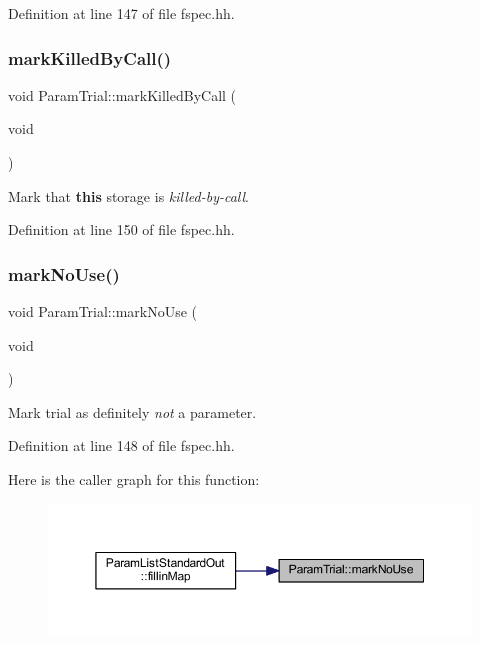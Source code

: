 Definition at line 147 of file fspec.\+hh.

\mbox{\label{class_param_trial_a8b08e858cac5d750f527a673be97e322}} 
\subsubsection{\texorpdfstring{markKilledByCall()}{markKilledByCall()}}
{\footnotesize\ttfamily void Param\+Trial\+::mark\+Killed\+By\+Call (\begin{DoxyParamCaption}\item[{void}]{ }\end{DoxyParamCaption})\hspace{0.3cm}{\ttfamily [inline]}}



Mark that {\bfseries{this}} storage is {\itshape killed-\/by-\/call}. 



Definition at line 150 of file fspec.\+hh.

\mbox{\label{class_param_trial_a7006ab058b4af10027cc87ee1b81b476}} 
\subsubsection{\texorpdfstring{markNoUse()}{markNoUse()}}
{\footnotesize\ttfamily void Param\+Trial\+::mark\+No\+Use (\begin{DoxyParamCaption}\item[{void}]{ }\end{DoxyParamCaption})\hspace{0.3cm}{\ttfamily [inline]}}



Mark trial as definitely {\itshape not} a parameter. 



Definition at line 148 of file fspec.\+hh.

Here is the caller graph for this function\+:
\nopagebreak
\begin{figure}[H]
\begin{center}
\leavevmode
\includegraphics[width=350pt]{class_param_trial_a7006ab058b4af10027cc87ee1b81b476_icgraph}
\end{center}
\end{figure}
\mbox{\label{class_param_trial_a7ede623de85ba60fc1b3e463de10b0fc}} 
